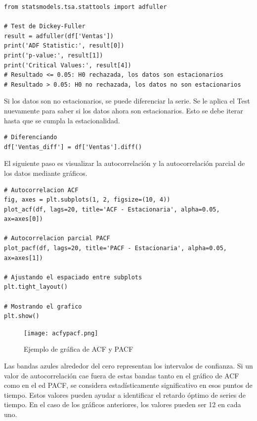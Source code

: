 \documentclass[a4paper, 12pt]{book}
\begin{document}
\begin{verbatim}
from statsmodels.tsa.stattools import adfuller

# Test de Dickey-Fuller
result = adfuller(df['Ventas'])
print('ADF Statistic:', result[0])
print('p-value:', result[1])
print('Critical Values:', result[4])
# Resultado <= 0.05: H0 rechazada, los datos son estacionarios
# Resultado > 0.05: H0 no rechazada, los datos no son estacionarios
\end{verbatim}

Si los datos son no estacionarios, se puede diferenciar la serie. Se le aplica el Test nuevamente para saber si los datos ahora son estacionarios. Esto se debe iterar hasta que se cumpla la estacionalidad.
\begin{verbatim}
# Diferenciando
df['Ventas_diff'] = df['Ventas'].diff()
\end{verbatim}

El siguiente paso es visualizar la autocorrelación y la autocorrelación parcial de los datos mediante gráficos.
\begin{verbatim}
# Autocorrelacion ACF
fig, axes = plt.subplots(1, 2, figsize=(10, 4))
plot_acf(df, lags=20, title='ACF - Estacionaria', alpha=0.05, ax=axes[0])

# Autocorrelacion parcial PACF
plot_pacf(df, lags=20, title='PACF - Estacionaria', alpha=0.05, ax=axes[1])

# Ajustando el espaciado entre subplots
plt.tight_layout()

# Mostrando el grafico
plt.show()
\end{verbatim}
\begin{figure}[H]
	\centering
	\texttt{[image: acfypacf.png]}
	\caption{Ejemplo de gráfica de ACF y PACF}
\end{figure}
Las bandas azules alrededor del cero representan los intervalos de confianza. Si un valor de autocorrelación cae fuera de estas bandas tanto en el gráfico de ACF como en el ed PACF, se considera estadísticamente significativo en esos puntos de tiempo.  Estos valores pueden ayudar a identificar el retardo óptimo de series de tiempo. En el caso de los gráficos anteriores, los valores pueden ser 12 en cada uno.
\end{document}
